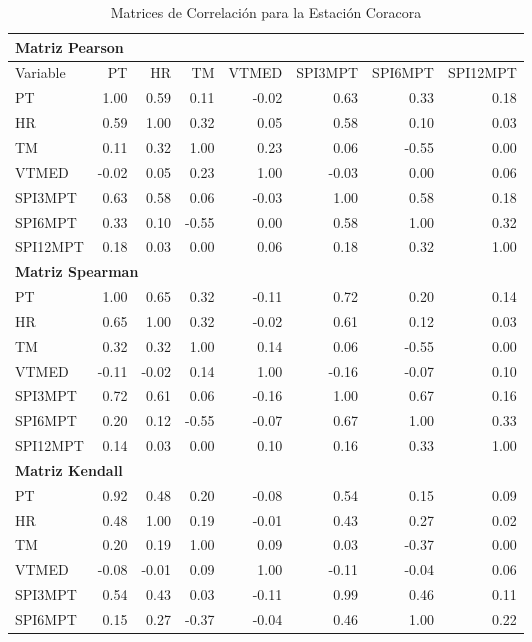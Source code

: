 \begin{table}[ht]
\centering
\caption{Matrices de Correlación para la Estación Coracora}
\begin{tabular}{lrrrrrrr}
\toprule
\multicolumn{8}{l}{\textbf{Matriz Pearson}} \\
\midrule
Variable & PT & HR & TM & VTMED & SPI3MPT & SPI6MPT & SPI12MPT \\
\midrule
PT       & 1.00 & 0.59 & 0.11 & -0.02 & 0.63 & 0.33 & 0.18 \\
HR       & 0.59 & 1.00 & 0.32 & 0.05 & 0.58 & 0.10 & 0.03 \\
TM       & 0.11 & 0.32 & 1.00 & 0.23 & 0.06 & -0.55 & 0.00 \\
VTMED    & -0.02 & 0.05 & 0.23 & 1.00 & -0.03 & 0.00 & 0.06 \\
SPI3MPT  & 0.63 & 0.58 & 0.06 & -0.03 & 1.00 & 0.58 & 0.18 \\
SPI6MPT  & 0.33 & 0.10 & -0.55 & 0.00 & 0.58 & 1.00 & 0.32 \\
SPI12MPT & 0.18 & 0.03 & 0.00 & 0.06 & 0.18 & 0.32 & 1.00 \\
\midrule
\multicolumn{8}{l}{\textbf{Matriz Spearman}} \\
\midrule
PT       & 1.00 & 0.65 & 0.32 & -0.11 & 0.72 & 0.20 & 0.14 \\
HR       & 0.65 & 1.00 & 0.32 & -0.02 & 0.61 & 0.12 & 0.03 \\
TM       & 0.32 & 0.32 & 1.00 & 0.14 & 0.06 & -0.55 & 0.00 \\
VTMED    & -0.11 & -0.02 & 0.14 & 1.00 & -0.16 & -0.07 & 0.10 \\
SPI3MPT  & 0.72 & 0.61 & 0.06 & -0.16 & 1.00 & 0.67 & 0.16 \\
SPI6MPT  & 0.20 & 0.12 & -0.55 & -0.07 & 0.67 & 1.00 & 0.33 \\
SPI12MPT & 0.14 & 0.03 & 0.00 & 0.10 & 0.16 & 0.33 & 1.00 \\
\midrule
\multicolumn{8}{l}{\textbf{Matriz Kendall}} \\
\midrule
PT       & 0.92 & 0.48 & 0.20 & -0.08 & 0.54 & 0.15 & 0.09 \\
HR       & 0.48 & 1.00 & 0.19 & -0.01 & 0.43 & 0.27 & 0.02 \\
TM       & 0.20 & 0.19 & 1.00 & 0.09 & 0.03 & -0.37 & 0.00 \\
VTMED    & -0.08 & -0.01 & 0.09 & 1.00 & -0.11 & -0.04 & 0.06 \\
SPI3MPT  & 0.54 & 0.43 & 0.03 & -0.11 & 0.99 & 0.46 & 0.11 \\
SPI6MPT  & 0.15 & 0.27 & -0.37 & -0.04 & 0.46 & 1.00 & 0.22 \\

\end{tabular}
\end{table}
